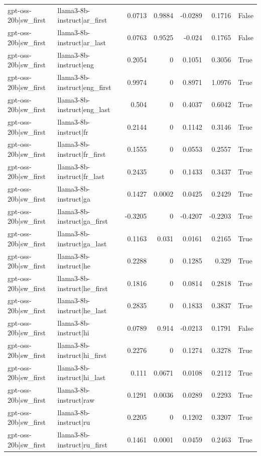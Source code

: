 \begin{table}
\begin{tabular}{l l r r r r l}
gpt-oss-20b|sw_first & llama3-8b-instruct|ar_first & 0.0713 & 0.9884 & -0.0289 & 0.1716 & False \\
gpt-oss-20b|sw_first & llama3-8b-instruct|ar_last & 0.0763 & 0.9525 & -0.024 & 0.1765 & False \\
gpt-oss-20b|sw_first & llama3-8b-instruct|eng & 0.2054 & 0 & 0.1051 & 0.3056 & True \\
gpt-oss-20b|sw_first & llama3-8b-instruct|eng_first & 0.9974 & 0 & 0.8971 & 1.0976 & True \\
gpt-oss-20b|sw_first & llama3-8b-instruct|eng_last & 0.504 & 0 & 0.4037 & 0.6042 & True \\
gpt-oss-20b|sw_first & llama3-8b-instruct|fr & 0.2144 & 0 & 0.1142 & 0.3146 & True \\
gpt-oss-20b|sw_first & llama3-8b-instruct|fr_first & 0.1555 & 0 & 0.0553 & 0.2557 & True \\
gpt-oss-20b|sw_first & llama3-8b-instruct|fr_last & 0.2435 & 0 & 0.1433 & 0.3437 & True \\
gpt-oss-20b|sw_first & llama3-8b-instruct|ga & 0.1427 & 0.0002 & 0.0425 & 0.2429 & True \\
gpt-oss-20b|sw_first & llama3-8b-instruct|ga_first & -0.3205 & 0 & -0.4207 & -0.2203 & True \\
gpt-oss-20b|sw_first & llama3-8b-instruct|ga_last & 0.1163 & 0.031 & 0.0161 & 0.2165 & True \\
gpt-oss-20b|sw_first & llama3-8b-instruct|he & 0.2288 & 0 & 0.1285 & 0.329 & True \\
gpt-oss-20b|sw_first & llama3-8b-instruct|he_first & 0.1816 & 0 & 0.0814 & 0.2818 & True \\
gpt-oss-20b|sw_first & llama3-8b-instruct|he_last & 0.2835 & 0 & 0.1833 & 0.3837 & True \\
gpt-oss-20b|sw_first & llama3-8b-instruct|hi & 0.0789 & 0.914 & -0.0213 & 0.1791 & False \\
gpt-oss-20b|sw_first & llama3-8b-instruct|hi_first & 0.2276 & 0 & 0.1274 & 0.3278 & True \\
gpt-oss-20b|sw_first & llama3-8b-instruct|hi_last & 0.111 & 0.0671 & 0.0108 & 0.2112 & True \\
gpt-oss-20b|sw_first & llama3-8b-instruct|raw & 0.1291 & 0.0036 & 0.0289 & 0.2293 & True \\
gpt-oss-20b|sw_first & llama3-8b-instruct|ru & 0.2205 & 0 & 0.1202 & 0.3207 & True \\
gpt-oss-20b|sw_first & llama3-8b-instruct|ru_first & 0.1461 & 0.0001 & 0.0459 & 0.2463 & True \\

\end{tabular}
\end{table}
